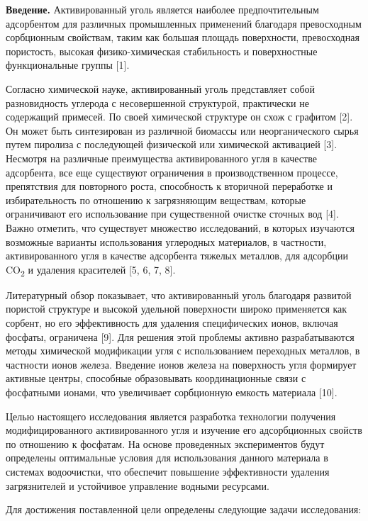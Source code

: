 \begin{multicols}{2}
{\bfseries Введение.} Активированный уголь является наиболее
предпочтительным адсорбентом для различных промышленных применений
благодаря превосходным сорбционным свойствам, таким как большая площадь
поверхности, превосходная пористость, высокая физико-химическая
стабильность и поверхностные функциональные группы {[}1{]}.

Согласно химической науке, активированный уголь представляет собой
разновидность углерода с несовершенной структурой, практически не
содержащий примесей. По своей химической структуре он схож с графитом
{[}2{]}. Он может быть синтезирован из различной биомассы или
неорганического сырья путем пиролиза с последующей физической или
химической активацией {[}3{]}. Несмотря на различные преимущества
активированного угля в качестве адсорбента, все еще существуют
ограничения в производственном процессе, препятствия для повторного
роста, способность к вторичной переработке и избирательность по
отношению к загрязняющим веществам, которые ограничивают его
использование при существенной очистке сточных вод {[}4{]}. Важно
отметить, что существует множество исследований, в которых изучаются
возможные варианты использования углеродных материалов, в частности,
активированного угля в качестве адсорбента тяжелых металлов, для
адсорбции CO\textsubscript{2} и удаления красителей {[}5, 6, 7, 8{]}.

Литературный обзор показывает, что активированный уголь благодаря
развитой пористой структуре и высокой удельной поверхности широко
применяется как сорбент, но его эффективность для удаления специфических
ионов, включая фосфаты, ограничена {[}9{]}. Для решения этой проблемы
активно разрабатываются методы химической модификации угля с
использованием переходных металлов, в частности ионов железа. Введение
ионов железа на поверхность угля формирует активные центры, способные
образовывать координационные связи с фосфатными ионами, что увеличивает
сорбционную емкость материала {[}10{]}.

Целью настоящего исследования является разработка технологии получения
модифицированного активированного угля и изучение его адсорбционных
свойств по отношению к фосфатам. На основе проведенных экспериментов
будут определены оптимальные условия для использования данного материала
в системах водоочистки, что обеспечит повышение эффективности удаления
загрязнителей и устойчивое управление водными ресурсами.

Для достижения поставленной цели определены следующие задачи
исследования:


\end{multicols}
